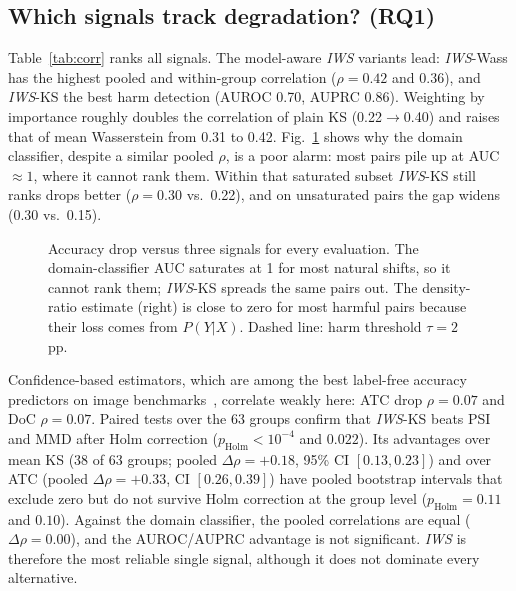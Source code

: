 \documentclass[conference]{IEEEtran}
\theoremstyle{plainhead}
\newcommand{\iws}{\textit{IWS}}
\newcommand{\pp}{\,pp\xspace}
\begin{document}
\subsection{Which signals track degradation? (RQ1)}
Table~\ref{tab:corr} ranks all signals. The model-aware \iws{} variants lead: \iws{}-Wass has the highest pooled and within-group correlation ($\rho=0.42$ and $0.36$), and \iws{}-KS the best harm detection (AUROC 0.70, AUPRC 0.86). Weighting by importance roughly doubles the correlation of plain KS (0.22$\to$0.40) and raises that of mean Wasserstein from 0.31 to 0.42. Fig.~\ref{fig:scatter} shows why the domain classifier, despite a similar pooled $\rho$, is a poor alarm: most pairs pile up at AUC $\approx1$, where it cannot rank them. Within that saturated subset \iws{}-KS still ranks drops better ($\rho=0.30$ vs.\ 0.22), and on unsaturated pairs the gap widens (0.30 vs.\ 0.15).

\begin{table}[t]
\centering
\caption{Rank correlation of each label-free signal with the accuracy drop and detection of harmful shifts ($\Delta>2$\pp), 1{,}557 evaluations. D = data-only, M = model-aware, O = model-output; $^\dagger$ proposed. Best underlined.}
\label{tab:corr}
\footnotesize
\setlength{\tabcolsep}{3pt}

\end{table}

\begin{figure}[t]
\centering

\caption{Accuracy drop versus three signals for every evaluation. The domain-classifier AUC saturates at 1 for most natural shifts, so it cannot rank them; \iws{}-KS spreads the same pairs out. The density-ratio estimate (right) is close to zero for most harmful pairs because their loss comes from $P(Y|X)$. Dashed line: harm threshold $\tau=2$\pp.}
\label{fig:scatter}
\end{figure}

Confidence-based estimators, which are among the best label-free accuracy predictors on image benchmarks~\cite{deng2023confidence,xie2024mano}, correlate weakly here: ATC drop $\rho=0.07$ and DoC $\rho=0.07$. Paired tests over the 63 groups confirm that \iws{}-KS beats PSI and MMD after Holm correction ($p_\text{Holm}<10^{-4}$ and $0.022$). Its advantages over mean KS (38 of 63 groups; pooled $\Delta\rho=+0.18$, 95\% CI $[0.13,0.23]$) and over ATC (pooled $\Delta\rho=+0.33$, CI $[0.26,0.39]$) have pooled bootstrap intervals that exclude zero but do not survive Holm correction at the group level ($p_\text{Holm}=0.11$ and $0.10$). Against the domain classifier, the pooled correlations are equal ($\Delta\rho=0.00$), and the AUROC/AUPRC advantage is not significant. \iws{} is therefore the most reliable single signal, although it does not dominate every alternative.
\end{document}
